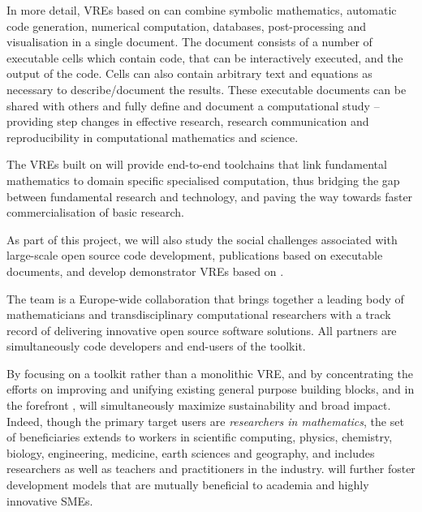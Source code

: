 In more detail, VREs based on \TheProject can combine symbolic
mathematics, automatic code generation, numerical computation,
databases, post-processing and visualisation in a single document. The
document consists of a number of executable cells which contain code,
that can be interactively executed, and the output of the code. Cells
can also contain arbitrary text and equations as necessary to
describe/document the results. These executable documents can be
shared with others and fully define and document a computational study
-- providing step changes in effective research, research
communication and reproducibility in computational mathematics and
science.

The VREs built on \TheProject will provide end-to-end toolchains that
link fundamental mathematics to domain specific specialised
computation, thus bridging the gap between fundamental research and
technology, and paving the way towards faster commercialisation of
basic research.

As part of this project, we will also study the social challenges
associated with large-scale open source code development, publications based on executable documents, and develop
demonstrator VREs based on \TheProject.

The \TheProject team is a Europe-wide collaboration that brings together a
leading body of mathematicians and transdisciplinary computational
researchers with a track record of delivering innovative open source
software solutions. All partners are simultaneously code developers and
end-users of the toolkit.

By focusing on a toolkit rather than a monolithic VRE, and by
concentrating the efforts on improving and unifying existing general
purpose building blocks, and in the forefront \Jupyter, \TheProject
will simultaneously maximize sustainability and broad impact. Indeed,
though the primary target users are \emph{researchers in
  mathematics}, the set of beneficiaries extends to workers in scientific
computing, physics, chemistry, biology, engineering, medicine, earth
sciences and geography, and includes researchers as well as teachers
and practitioners in the industry. \TheProject will further foster
development models that are mutually beneficial to academia and highly
innovative SMEs.






\clearpage


